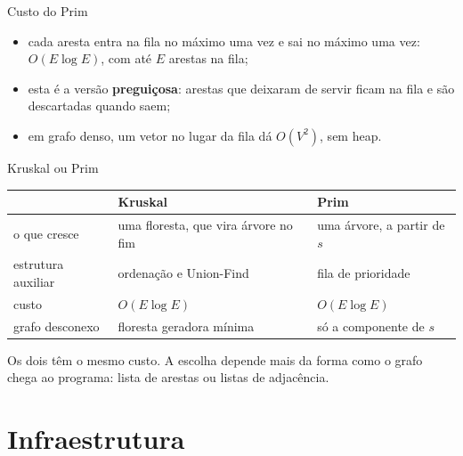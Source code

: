 \documentclass{beamer}
\begin{document}
\begin{frame}{Custo do Prim}
	\begin{itemize}
		\item cada aresta entra na fila no máximo uma vez e sai no máximo uma
		      vez: $O(E \log E)$, com até $E$ arestas na fila;
		\item esta é a versão \textbf{preguiçosa}: arestas que deixaram de servir
		      ficam na fila e são descartadas quando saem;
		\item em grafo denso, um vetor no lugar da fila dá $O(V^2)$, sem heap.
	\end{itemize}
\end{frame}

\begin{frame}{Kruskal ou Prim}
	\small
	\begin{center}
		\begin{tabular}{>{\raggedright}p{2.6cm}>{\raggedright}p{3.4cm}>{\raggedright\arraybackslash}p{3.4cm}}
			\toprule
			& Kruskal & Prim \\
			\midrule
			o que cresce & uma floresta, que vira árvore no fim & uma árvore, a partir de $s$ \\
			estrutura auxiliar & ordenação e Union-Find & fila de prioridade \\
			custo & $O(E \log E)$ & $O(E \log E)$ \\
			grafo desconexo & floresta geradora mínima & só a componente de $s$ \\
			\bottomrule
		\end{tabular}
	\end{center}

	\vspace{0.3cm}
	Os dois têm o mesmo custo. A escolha depende mais da forma como o grafo
	chega ao programa: lista de arestas ou listas de adjacência.
\end{frame}

\section{Infraestrutura}
\end{document}
